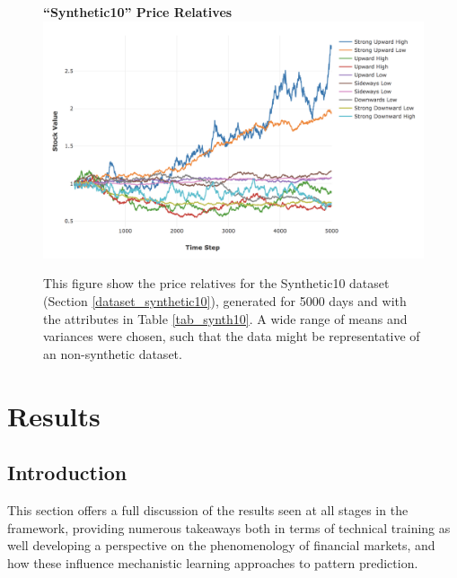 \documentclass[a4paper,11pt,oneside]{article}
\theoremstyle{plain}
\theoremstyle{definition}
\begin{document}
	
	
	\begin{figure}[H]
		\centering
		\textbf{``Synthetic10'' Price Relatives}
		\includegraphics[scale=0.45]{images/results/prices/synthetic10_prices.png} 
		\caption[Synthetic10 Price Relatives]{This figure show the price relatives for the Synthetic10 dataset (Section \ref{dataset_synthetic10}), generated for 5000 days and with the attributes in Table \ref{tab_synth10}. A wide range of means and variances were chosen, such that the data might be representative of an non-synthetic dataset.}
		\label{figure-synthetic10_prices}
	\end{figure}
	

	
	
	
	
	
	
	
	
	
	\newpage
	\section{Results}\label{Results}
	\subsection{Introduction}\label{results_into}
	
	This section offers a full discussion of the results seen at all stages in the framework, providing numerous takeaways both in terms of technical training as well developing a perspective on the phenomenology of financial markets, and how these influence mechanistic learning approaches to pattern prediction. \newline
	
\end{document}
